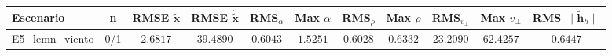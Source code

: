 \begin{tabular}{lcccccccccc}
\toprule
Escenario & n & RMSE $\tilde{\mathbf{x}}$ & RMSE $\dot{\tilde{\mathbf{x}}}$ & RMS$_\alpha$ & Max $\alpha$ & RMS$_\rho$ & Max $\rho$ & RMS$_{v_\perp}$ & Max $v_\perp$ & RMS $\|\tilde{\mathbf{h}}_h\|$ \\
\midrule
E5\_lemn\_viento & 0/1 & $2.6817$ & $39.4890$ & $0.6043$ & $1.5251$ & $0.6028$ & $0.6332$ & $23.2090$ & $62.4257$ & $0.6447$ \\
\bottomrule
\end{tabular}
